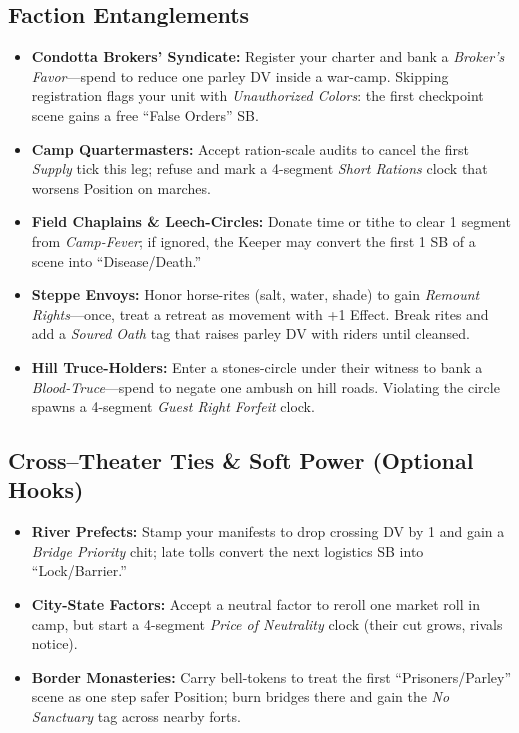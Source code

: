 \subsection*{Faction Entanglements}
\begin{itemize}
  \item \textbf{Condotta Brokers’ Syndicate:} Register your charter and bank a \emph{Broker’s Favor}—spend to reduce one parley DV inside a war-camp. Skipping registration flags your unit with \emph{Unauthorized Colors}: the first checkpoint scene gains a free “False Orders” SB.
  \item \textbf{Camp Quartermasters:} Accept ration-scale audits to cancel the first \emph{Supply} tick this leg; refuse and mark a 4-segment \emph{Short Rations} clock that worsens Position on marches.
  \item \textbf{Field Chaplains \& Leech-Circles:} Donate time or tithe to clear 1 segment from \emph{Camp-Fever}; if ignored, the Keeper may convert the first 1 SB of a scene into “Disease/Death.”
  \item \textbf{Steppe Envoys:} Honor horse-rites (salt, water, shade) to gain \emph{Remount Rights}—once, treat a retreat as movement with +1 Effect. Break rites and add a \emph{Soured Oath} tag that raises parley DV with riders until cleansed.
  \item \textbf{Hill Truce-Holders:} Enter a stones-circle under their witness to bank a \emph{Blood-Truce}—spend to negate one ambush on hill roads. Violating the circle spawns a 4-segment \emph{Guest Right Forfeit} clock.
\end{itemize}

\subsection*{Cross–Theater Ties \& Soft Power (Optional Hooks)}
\begin{itemize}
  \item \textbf{River Prefects:} Stamp your manifests to drop crossing DV by 1 and gain a \emph{Bridge Priority} chit; late tolls convert the next logistics SB into “Lock/Barrier.”
  \item \textbf{City-State Factors:} Accept a neutral factor to reroll one market roll in camp, but start a 4-segment \emph{Price of Neutrality} clock (their cut grows, rivals notice).
  \item \textbf{Border Monasteries:} Carry bell-tokens to treat the first “Prisoners/Parley” scene as one step safer Position; burn bridges there and gain the \emph{No Sanctuary} tag across nearby forts.
\end{itemize}

